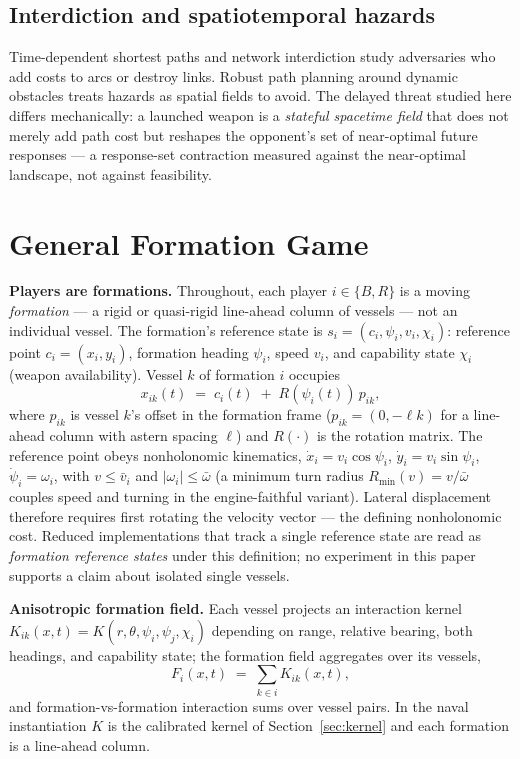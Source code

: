 \documentclass[12pt,a4paper]{article}
\begin{document}
\subsection{Interdiction and spatiotemporal hazards}
Time-dependent shortest paths \cite{orda1990} and network interdiction
\cite{israeli2002} study adversaries who add costs to arcs or destroy
links.  Robust path planning around dynamic obstacles treats hazards as
spatial fields to avoid.  The delayed threat studied here differs
mechanically: a launched weapon is a \emph{stateful spacetime field} that
does not merely add path cost but reshapes the opponent's set of
near-optimal future responses --- a response-set contraction measured
against the near-optimal landscape, not against feasibility.

\section{General Formation Game}\label{sec:model}

\noindent\textbf{Players are formations.}  Throughout, each player
$i\in\{B,R\}$ is a moving \emph{formation} --- a rigid or quasi-rigid
line-ahead column of vessels --- not an individual vessel.  The formation's
reference state is $s_i=(c_i,\psi_i,v_i,\chi_i)$: reference point
$c_i=(x_i,y_i)$, formation heading $\psi_i$, speed $v_i$, and capability
state $\chi_i$ (weapon availability).  Vessel $k$ of formation $i$ occupies
\begin{equation}
x_{ik}(t) \;=\; c_i(t) \;+\; R(\psi_i(t))\, p_{ik},
\label{eq:formation}
\end{equation}
where $p_{ik}$ is vessel $k$'s offset in the formation frame ($p_{ik}=(0,
-\ell k)$ for a line-ahead column with astern spacing $\ell$) and
$R(\cdot)$ is the rotation matrix.  The reference point obeys nonholonomic
kinematics, $\dot x_i=v_i\cos\psi_i$, $\dot y_i=v_i\sin\psi_i$,
$\dot\psi_i=\omega_i$, with $v\le\bar v_i$ and $|\omega_i|\le\bar\omega$ (a
minimum turn radius $R_{\min}(v)=v/\bar\omega$ couples speed and turning in
the engine-faithful variant).  Lateral displacement therefore requires first
rotating the velocity vector --- the defining nonholonomic cost.  Reduced
implementations that track a single reference state are read as
\emph{formation reference states} under this definition; no experiment in
this paper supports a claim about isolated single vessels.

\noindent\textbf{Anisotropic formation field.}  Each vessel projects an
interaction kernel $K_{ik}(x,t)=K(r,\theta,\psi_i,\psi_j,\chi_i)$ depending
on range, relative bearing, both headings, and capability state; the
formation field aggregates over its vessels,
\begin{equation}
F_i(x,t) \;=\; \sum_{k\in i} K_{ik}(x,t),
\label{eq:ffield}
\end{equation}
and formation-vs-formation interaction sums over vessel pairs.  In the
naval instantiation $K$ is the calibrated kernel of
Section~\ref{sec:kernel} and each formation is a line-ahead column.
\end{document}
